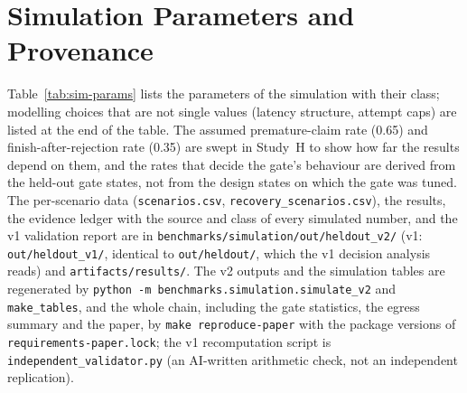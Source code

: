 \section{Simulation Parameters and Provenance}
\label{app:simparams}

Table~\ref{tab:sim-params} lists the parameters of the simulation with their class; modelling choices that are not single values (latency structure, attempt caps) are listed at the end of the table. The assumed premature-claim rate (0.65) and finish-after-rejection rate (0.35) are swept in Study~H to show how far the results depend on them, and the rates that decide the gate's behaviour are derived from the held-out gate states, not from the design states on which the gate was tuned. The per-scenario data (\texttt{scenarios.csv}, \texttt{recovery\_scenarios.csv}), the results, the evidence ledger with the source and class of every simulated number, and the v1 validation report are in \texttt{benchmarks/simulation/out/heldout\_v2/} (v1: \texttt{out/heldout\_v1/}, identical to \texttt{out/heldout/}, which the v1 decision analysis reads) and \texttt{artifacts/results/}. The v2 outputs and the simulation tables are regenerated by \texttt{python -m benchmarks.simulation.simulate\_v2} and \texttt{make\_tables}, and the whole chain, including the gate statistics, the egress summary and the paper, by \texttt{make reproduce-paper} with the package versions of \texttt{requirements-paper.lock}; the v1 recomputation script is \texttt{independent\_validator.py} (an AI-written arithmetic check, not an independent replication).


